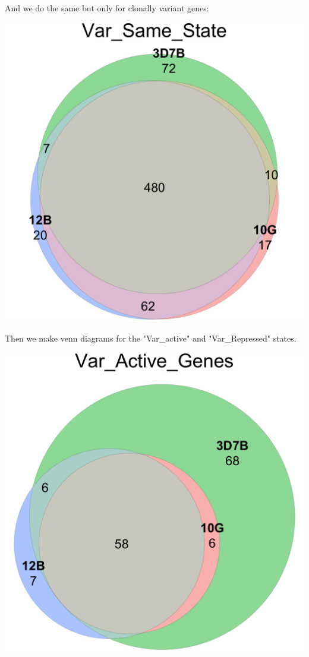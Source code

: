 \documentclass[11pt]{article}
\begin{document}
And we do the same but only for clonally variant genes:

\begin{center}
\includegraphics[width=.9\linewidth]{./Plots/venn_Var_Same_State.png}
\end{center}

Then we make venn diagrams for the "Var\_active" and "Var\_Repressed" states.

\begin{center}
\includegraphics[width=.9\linewidth]{./Plots/venn_Var_Active_Genes.png}
\end{center}
\end{document}
